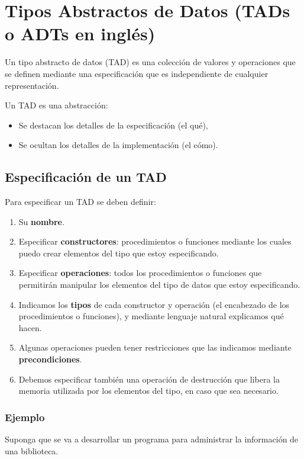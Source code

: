 \chapter{Tipos Abstractos de Datos (TADs o ADTs en inglés)}

Un tipo abstracto de datos (TAD) es una colección de valores y operaciones que se definen mediante una especificación que es independiente de cualquier representación.

Un TAD es una abstracción:
\begin{itemize}
    \item Se destacan los detalles de la especificación (el qué),
    \item Se ocultan los detalles de la implementación (el cómo).
\end{itemize}

\section{Especificación de un TAD}
Para especificar un TAD se deben definir:
\begin{enumerate}
    \item Su \textbf{nombre}.
    \item Especificar \textbf{constructores}: procedimientos o funciones mediante los cuales puedo crear elementos del tipo que estoy especificando.
    \item Especificar \textbf{operaciones}: todos los procedimientos o funciones que permitirán manipular los elementos del tipo de datos que estoy especificando.
    \item Indicamos los \textbf{tipos} de cada constructor y operación (el encabezado de los procedimientos o funciones), y mediante lenguaje natural explicamos qué hacen.
    \item Algunas operaciones pueden tener restricciones que las indicamos mediante \textbf{precondiciones}.
    \item Debemos especificar también una operación de destrucción que libera la memoria utilizada por los elementos del tipo, en caso que sea necesario.
\end{enumerate}

\subsection{Ejemplo}
Suponga que se va a desarrollar un programa para administrar la información de una biblioteca.

